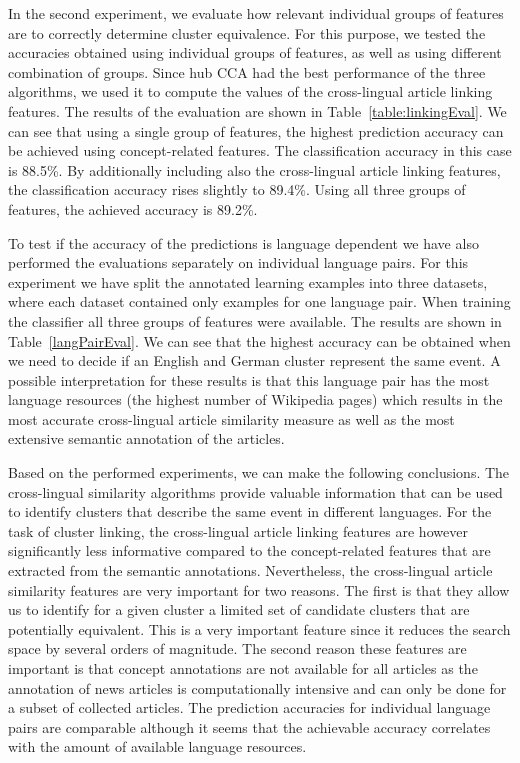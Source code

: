 \documentclass[twoside,11pt]{article}
\begin{document}
In the second experiment, we evaluate how relevant individual groups of features are to correctly determine cluster equivalence. For this purpose, we tested the accuracies obtained using individual groups of features, as well as using different combination of groups. Since hub CCA had the best  performance of the three algorithms, we used it to compute the values of the cross-lingual article linking features. The results of the evaluation are shown in Table~\ref{table:linkingEval}. We can see that using a single group of features, the highest prediction accuracy can be achieved using  concept-related features. The classification accuracy in this case is 88.5\%. By additionally including also the cross-lingual article linking features, the classification accuracy rises slightly to 89.4\%. Using all three groups of features, the achieved accuracy is 89.2\%.

To test if the accuracy of the predictions is language dependent we have also performed the evaluations separately on individual language pairs. For this experiment we have split the annotated learning examples into three datasets, where each dataset contained only examples for one language pair. When training the classifier all three groups of features were available. The results are shown in Table~\ref{langPairEval}. We can see that the highest accuracy can be obtained when we need to decide if an English and German cluster represent the same event. A possible interpretation for these results is that this language pair has the most language resources (the highest number of Wikipedia pages) which results in the most accurate cross-lingual article similarity measure as well as the most extensive semantic annotation of the articles.

Based on the performed experiments, we can make the following conclusions. The cross-lingual similarity algorithms provide valuable information that can be used to identify clusters that describe the same event in different languages. For the task of cluster linking, the cross-lingual article linking features are however significantly less informative compared to the concept-related features that are extracted from the semantic annotations. Nevertheless, the cross-lingual article similarity features are very important for two reasons. The first  is that they allow us to identify for a given cluster a limited set of candidate clusters that are potentially equivalent. This is a very important feature since it reduces the search space by several orders of magnitude. The second reason these features are important is that concept annotations are not available for all articles as the annotation of news articles is computationally intensive and can only be done for a subset of collected articles. The prediction accuracies for individual language pairs are comparable although it seems that the achievable accuracy correlates with the amount of available language resources.
\end{document}
